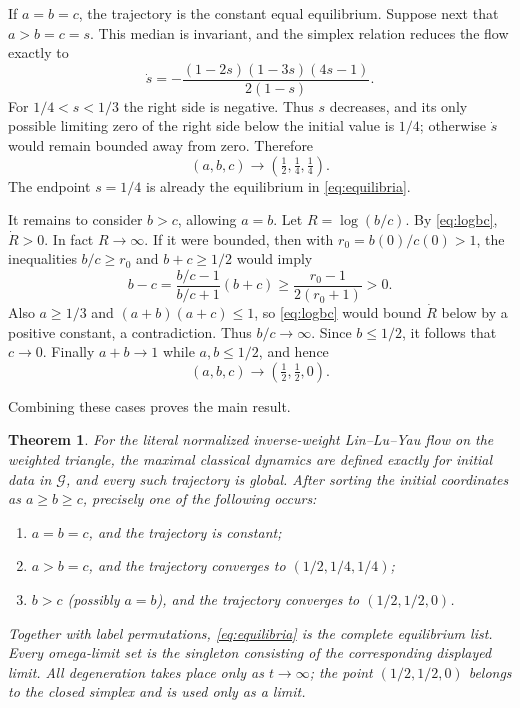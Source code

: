 \documentclass[11pt]{article}
\newtheorem{theorem}{Theorem}
\theoremstyle{remark}
\newcommand{\G}{\mathcal G}
\begin{document}
If $a=b=c$, the trajectory is the constant equal equilibrium.  Suppose next
that $a>b=c=s$.  This median is invariant, and the simplex relation reduces
the flow exactly to
\begin{equation}\label{eq:median}
 \dot s=-\frac{(1-2s)(1-3s)(4s-1)}{2(1-s)}.
\end{equation}
For $1/4<s<1/3$ the right side is negative.  Thus $s$ decreases, and its
only possible limiting zero of the right side below the initial value is
$1/4$; otherwise $\dot s$ would remain bounded away from zero.  Therefore
\[
 (a,b,c)\longrightarrow(\tfrac12,\tfrac14,\tfrac14).
\]
The endpoint $s=1/4$ is already the equilibrium in
\eqref{eq:equilibria}.

It remains to consider $b>c$, allowing $a=b$.  Let $R=\log(b/c)$.  By
\eqref{eq:logbc}, $\dot R>0$.  In fact $R\to\infty$.  If it were bounded,
then with $r_0=b(0)/c(0)>1$, the inequalities $b/c\geq r_0$ and
$b+c\geq1/2$ would imply
\[
 b-c=\frac{b/c-1}{b/c+1}(b+c)
 \geq\frac{r_0-1}{2(r_0+1)}>0.
\]
Also $a\geq1/3$ and $(a+b)(a+c)\leq1$, so \eqref{eq:logbc} would bound
$\dot R$ below by a positive constant, a contradiction.  Thus $b/c\to
\infty$.  Since $b\leq1/2$, it follows that $c\to0$.  Finally
$a+b\to1$ while $a,b\leq1/2$, and hence
\[
 (a,b,c)\longrightarrow(\tfrac12,\tfrac12,0).
\]

Combining these cases proves the main result.

\begin{theorem}\label{thm:classification}
For the literal normalized inverse-weight Lin--Lu--Yau flow on the weighted
triangle, the maximal classical dynamics are defined exactly for initial data
in $\G$, and every such trajectory is global.  After sorting the initial
coordinates as $a\geq b\geq c$, precisely one of the following occurs:
\begin{enumerate}
 \item $a=b=c$, and the trajectory is constant;
 \item $a>b=c$, and the trajectory converges to
 $(1/2,1/4,1/4)$;
 \item $b>c$ (possibly $a=b$), and the trajectory converges to
 $(1/2,1/2,0)$.
\end{enumerate}
Together with label permutations, \eqref{eq:equilibria} is the complete
equilibrium list.  Every omega-limit set is the singleton consisting of the
corresponding displayed limit.  All degeneration takes place only as
$t\to\infty$; the point $(1/2,1/2,0)$ belongs to the closed simplex and is
used only as a limit.
\end{theorem}
\end{document}
